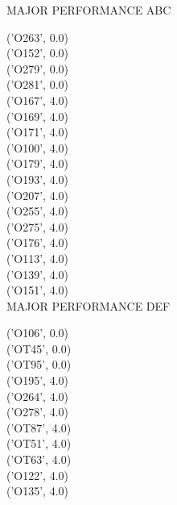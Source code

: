 
MAJOR PERFORMANCE ABC

('O263', 0.0)\\
('O152', 0.0)\\
('O279', 0.0)\\
('O281', 0.0)\\
('O167', 4.0)\\
('O169', 4.0)\\
('O171', 4.0)\\
('O100', 4.0)\\
('O179', 4.0)\\
('O193', 4.0)\\
('O207', 4.0)\\
('O255', 4.0)\\
('O275', 4.0)\\
('O176', 4.0)\\
('O113', 4.0)\\
('O139', 4.0)\\
('O151', 4.0)\\

MAJOR PERFORMANCE DEF

('O106', 0.0)\\
('OT45', 0.0)\\
('OT95', 0.0)\\
('O195', 4.0)\\
('O264', 4.0)\\
('O278', 4.0)\\
('OT87', 4.0)\\
('OT51', 4.0)\\
('OT63', 4.0)\\
('O122', 4.0)\\
('O135', 4.0)\\

